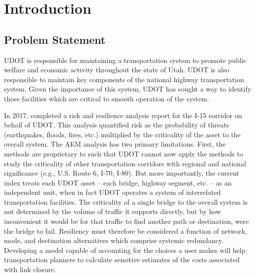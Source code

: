 \chapter{Introduction}
\label{chp:chapter1}
\graphicspath{{figures/}{figures/chapter1/}}

\section{Problem Statement}
UDOT is responsible for maintaining a
transportation system to promote public welfare and economic activity throughout
the state of Utah. UDOT is also responsible to maintain key components of the
national highway transportation system. Given the importance of this system,
UDOT has sought a way to identify those facilities which are critical to smooth
operation of the system.

In 2017, \citet{aem2017} completed a risk and resilience analysis report for the I-15 corridor on behalf of
UDOT. This analysis quantified risk as the probability of threats (earthquakes, floods, fires,
etc.) multiplied by the criticality of the asset to the overall system. The AEM
analysis has two primary limitations. First, the methods are proprietary to
\citet{aem2017} such that UDOT cannot now apply the methods to study the criticality of other transportation
corridors with regional and national significance (e.g., U.S. Route 6, I-70, I-80). But more
importantly, the current index treats each UDOT asset – each bridge, highway segment, etc. – as an
independent unit, when in fact UDOT operates a system of interrelated transportation facilities. The criticality
of a single bridge to the overall system is not determined by the volume of traffic it supports
directly, but by how inconvenient it would be for that traffic to find another path or destination,
were the bridge to fail. Resiliency must therefore be considered a function of network, mode, and destination
alternatives which comprise systemic redundancy. Developing a model capable of accounting for the choices a user makes will help
transportation planners to calculate sensitive estimates of the costs associated with link closure.

